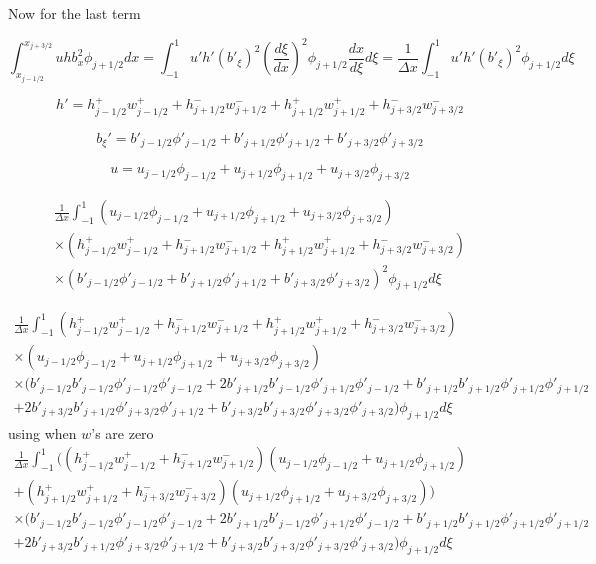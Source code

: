 \documentclass[12pt]{article}
\begin{document}
Now for the last term

\[\int_{x_{j-1/2}}^{x_{j+3/2}} u h b_x^2 \phi_{j +1/2}dx  = \int_{-1}^{1} u' h' (b'_\xi)^2 \left(\frac{d\xi}{dx} \right)^2 \phi_{j +1/2} \frac{dx}{d\xi} d \xi =\frac{1}{\Delta x} \int_{-1}^{1} u' h' (b'_\xi)^2 \phi_{j +1/2} d \xi \]

\[h' = h^+_{j-1/2} w^+_{j-1/2} + h^-_{j+1/2} w^-_{j+1/2} + h^+_{j+1/2} w^+_{j+1/2} + h^-_{j+3/2} w^-_{j+3/2}   \]

\[b_{\xi}' = b'_{j-1/2} \phi'_{j-1/2} +  b'_{j+1/2} \phi'_{j+1/2} +  b'_{j+3/2} \phi'_{j+3/2}   \]

\[u = u_{j-1/2} \phi_{j-1/2} +  u_{j+1/2} \phi_{j+1/2} + u_{j+3/2} \phi_{j+3/2}   \]

\begin{multline*}
\frac{1}{\Delta x} \int_{-1}^{1} \left(u_{j-1/2} \phi_{j-1/2} +  u_{j+1/2} \phi_{j+1/2} + u_{j+3/2} \phi_{j+3/2} \right)\\\times \left(h^+_{j-1/2} w^+_{j-1/2} + h^-_{j+1/2} w^-_{j+1/2} + h^+_{j+1/2} w^+_{j+1/2} + h^-_{j+3/2} w^-_{j+3/2}\right)\\\times\left(b'_{j-1/2} \phi'_{j-1/2} +  b'_{j+1/2} \phi'_{j+1/2} +  b'_{j+3/2} \phi'_{j+3/2} \right)^2 \phi_{j +1/2} d \xi 
\end{multline*}

\begin{multline*}
\frac{1}{\Delta x} \int_{-1}^{1}\left(h^+_{j-1/2} w^+_{j-1/2} + h^-_{j+1/2} w^-_{j+1/2} + h^+_{j+1/2} w^+_{j+1/2} + h^-_{j+3/2} w^-_{j+3/2}\right)\\\times \left(u_{j-1/2} \phi_{j-1/2} +  u_{j+1/2} \phi_{j+1/2} + u_{j+3/2} \phi_{j+3/2} \right)\\\times \big(b'_{j-1/2}b'_{j-1/2} \phi'_{j-1/2} \phi'_{j-1/2} +  2b'_{j+1/2}b'_{j-1/2} \phi'_{j+1/2}\phi'_{j-1/2} + b'_{j+1/2}b'_{j+1/2} \phi'_{j+1/2}\phi'_{j+1/2} \\ + 2b'_{j+3/2}b'_{j+1/2} \phi'_{j+3/2} \phi'_{j+1/2} +  b'_{j+3/2}b'_{j+3/2} \phi'_{j+3/2} \phi'_{j+3/2} \big)\phi_{j +1/2} d \xi 
\end{multline*}
using when $w$'s are zero
\begin{multline*}
\frac{1}{\Delta x} \int_{-1}^{1} \bigg(\left(h^+_{j-1/2} w^+_{j-1/2} + h^-_{j+1/2} w^-_{j+1/2} \right)\left(u_{j-1/2} \phi_{j-1/2} +  u_{j+1/2} \phi_{j+1/2} \right) \\+ \left( h^+_{j+1/2} w^+_{j+1/2} + h^-_{j+3/2} w^-_{j+3/2}\right)\left(u_{j+1/2} \phi_{j+1/2} + u_{j+3/2} \phi_{j+3/2} \right) \bigg)\\\times \big(b'_{j-1/2}b'_{j-1/2} \phi'_{j-1/2} \phi'_{j-1/2} +  2b'_{j+1/2}b'_{j-1/2} \phi'_{j+1/2}\phi'_{j-1/2} + b'_{j+1/2}b'_{j+1/2} \phi'_{j+1/2}\phi'_{j+1/2} \\ + 2b'_{j+3/2}b'_{j+1/2} \phi'_{j+3/2} \phi'_{j+1/2} +  b'_{j+3/2}b'_{j+3/2} \phi'_{j+3/2} \phi'_{j+3/2} \big)\phi_{j +1/2} d \xi 
\end{multline*}
\end{document}
